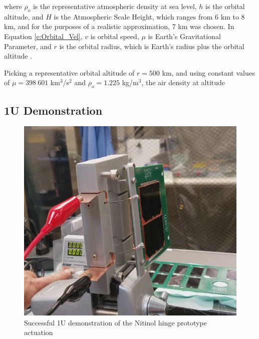 where $\rho_o$ is the representative atmospheric density at sea level, $h$ is the orbital altitude, and $H$ is the Atmospheric Scale Height, which ranges from 6 km to 8 km, and for the purposes of a realistic approximation, 7 km was chosen. In Equation \ref{e:Orbital_Vel}, $v$ is orbital speed, $\mu$ is Earth's Gravitational Parameter, and $r$ is the orbital radius, which is Earth's radius plus the orbital altitude \cite{wiesel2010spaceflight}.

Picking a representative orbital altitude of $r=500$ km, and using constant values of $\mu=398\:601$ km$^3$/s$^2$ and $\rho_o=1.225$ kg/m$^3$, the air density at altitude 
\subsection{1U Demonstration}
\begin{figure}[ht]
	\centering
 	\includegraphics[width=0.305\linewidth]{Ch4/Figures/1U_Demo_1.jpg}
    \caption{Successful 1U demonstration of the Nitinol hinge prototype actuation}
	\label{f:1U_Demo}
\end{figure}
\FloatBarrier


